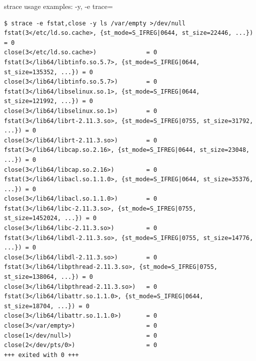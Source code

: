 \documentclass[unicode]{beamer}
\begin{document}
\begin{frame}[fragile]{strace usage examples: -y, -e trace=}
\tiny
\begin{verbatim}
$ strace -e fstat,close -y ls /var/empty >/dev/null
fstat(3</etc/ld.so.cache>, {st_mode=S_IFREG|0644, st_size=22446, ...}) = 0
close(3</etc/ld.so.cache>)              = 0
fstat(3</lib64/libtinfo.so.5.7>, {st_mode=S_IFREG|0644, st_size=135352, ...}) = 0
close(3</lib64/libtinfo.so.5.7>)        = 0
fstat(3</lib64/libselinux.so.1>, {st_mode=S_IFREG|0644, st_size=121992, ...}) = 0
close(3</lib64/libselinux.so.1>)        = 0
fstat(3</lib64/librt-2.11.3.so>, {st_mode=S_IFREG|0755, st_size=31792, ...}) = 0
close(3</lib64/librt-2.11.3.so>)        = 0
fstat(3</lib64/libcap.so.2.16>, {st_mode=S_IFREG|0644, st_size=23048, ...}) = 0
close(3</lib64/libcap.so.2.16>)         = 0
fstat(3</lib64/libacl.so.1.1.0>, {st_mode=S_IFREG|0644, st_size=35376, ...}) = 0
close(3</lib64/libacl.so.1.1.0>)        = 0
fstat(3</lib64/libc-2.11.3.so>, {st_mode=S_IFREG|0755, st_size=1452024, ...}) = 0
close(3</lib64/libc-2.11.3.so>)         = 0
fstat(3</lib64/libdl-2.11.3.so>, {st_mode=S_IFREG|0755, st_size=14776, ...}) = 0
close(3</lib64/libdl-2.11.3.so>)        = 0
fstat(3</lib64/libpthread-2.11.3.so>, {st_mode=S_IFREG|0755, st_size=138064, ...}) = 0
close(3</lib64/libpthread-2.11.3.so>)   = 0
fstat(3</lib64/libattr.so.1.1.0>, {st_mode=S_IFREG|0644, st_size=18704, ...}) = 0
close(3</lib64/libattr.so.1.1.0>)       = 0
close(3</var/empty>)                    = 0
close(1</dev/null>)                     = 0
close(2</dev/pts/0>)                    = 0
+++ exited with 0 +++
\end{verbatim}
\end{frame}
\end{document}
